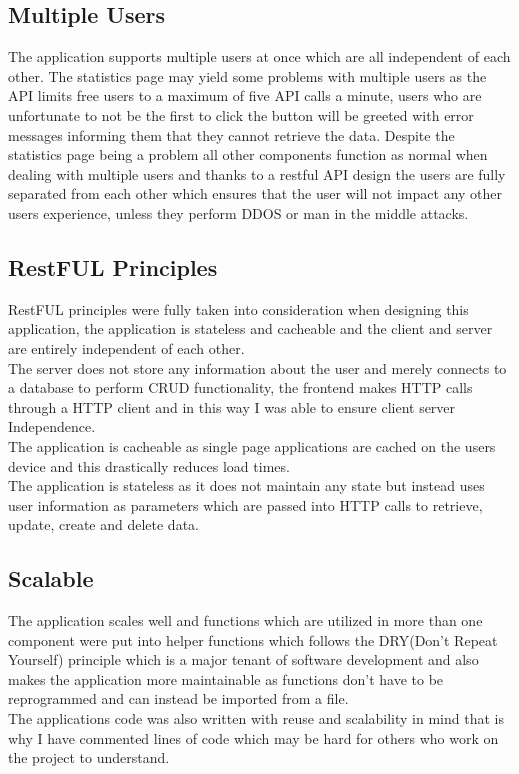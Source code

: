 \subsection{Multiple Users}
The application supports multiple users at once which are all independent of each
other.  The statistics page may yield some problems with multiple users as the
API limits free users to a maximum of five API calls a minute, users who are unfortunate
to not be the first to click the button will be greeted with error messages informing them
that they cannot retrieve the data.  Despite the statistics page being a problem all other
components function as normal when dealing with multiple users and thanks to a restful API
design the users are fully separated from each other which ensures that the user will not
impact any other users experience, unless they perform DDOS or man in the middle attacks.
\subsection{RestFUL Principles}
RestFUL principles were fully taken into consideration when designing this application,
the application is stateless and cacheable and the client and server are entirely independent of each other.
\\
 The server does not store any information
about the user and merely connects to a database to perform CRUD functionality, the
frontend makes HTTP calls through a HTTP client and in this way I was able to ensure
client server Independence.
\\
The application is cacheable as single page applications are cached on the users
device and this drastically reduces load times.
\\
The application is stateless as it does not maintain any state but instead uses
user information as parameters which are passed into HTTP calls to retrieve, update,
create and delete data.
\subsection{Scalable}
The application scales well and functions which are utilized in more than one component
were put into helper functions which follows the DRY(Don't Repeat Yourself) principle
which is a major tenant of software development and also makes the application more
maintainable as functions don't have to be reprogrammed and can instead be imported from
a file.
\\
The applications code was also written with reuse and scalability in mind that is why
I have commented lines of code which may be hard for others who work on the project to
understand.
